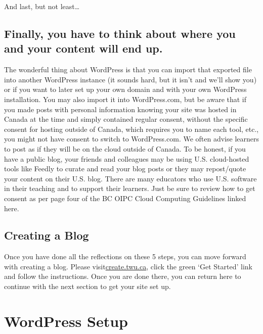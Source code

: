 \documentclass[
]{book}
\begin{document}
And last, but not least\ldots{}

\hypertarget{finally-you-have-to-think-about-where-you-and-your-content-will-end-up.}{%
\subsection*{Finally, you have to think about where you and your content will end up.}\label{finally-you-have-to-think-about-where-you-and-your-content-will-end-up.}}

The wonderful thing about WordPress is that you can import that exported file into another WordPress instance (it sounds hard, but it isn't and we'll show you) or if you want to later set up your own domain and with your own WordPress installation. You may also import it into WordPress.com, but be aware that if you made posts with personal information knowing your site was hosted in Canada at the time and simply contained regular consent, without the specific consent for hosting outside of Canada, which requires you to name each tool, etc., you might not have consent to switch to WordPress.com. We often advise learners to post as if they will be on the cloud outside of Canada. To be honest, if you have a public blog, your friends and colleagues may be using U.S. cloud-hosted tools like Feedly to curate and read your blog posts or they may repost/quote your content on their U.S. blog. There are many educators who use U.S. software in their teaching and to support their learners. Just be sure to review how to get consent as per page four of the BC OIPC Cloud Computing Guidelines linked here.

\hypertarget{creating-a-blog}{%
\subsection*{Creating a Blog}\label{creating-a-blog}}

Once you have done all the reflections on these 5 steps, you can move forward with creating a blog. Please visit\href{https://create.twu.ca}{create.twu.ca}, click the green `Get Started' link and follow the instructions. Once you are done there, you can return here to continue with the next section to get your site set up.

\hypertarget{wordpress-setup}{%
\section{WordPress Setup}\label{wordpress-setup}}
\end{document}
